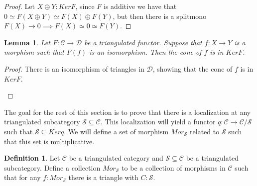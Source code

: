 \documentclass[12pt]{article}
\newtheorem{lemma}[theorem]{Lemma}
\theoremstyle{definition}
\newtheorem{definition}{Definition}[section]
\theoremstyle{remark}
\begin{document}
            \begin{proof}
                Let $X\oplus Y:KerF$, since $F$ is additive we have that $0\simeq F(X\oplus Y)\simeq F(X)\oplus F(Y)$, but then there is a splitmono $F(X)\rightarrow 0 \implies F(X)\simeq 0 \simeq F(Y)$.
            \end{proof}

            \begin{lemma}
                Let $F:\mathcal{C}\rightarrow\mathcal{D}$ be a triangulated functor. Suppose that $f:X\rightarrow Y$ is a morphism such that $F(f)$ is an isomorphism. Then the cone of $f$ is in $KerF$.
            \end{lemma}

            \begin{proof}
                There is an isomorphism of triangles in $\mathcal{D}$, showing that the cone of $f$ is in $KerF$.
                \begin{center}
                \end{center}
            \end{proof}

            The goal for the rest of this section is to prove that there is a localization at any triangulated subcategory $\mathcal{S}\subseteq\mathcal{C}$. This localization will yield a functor $q:\mathcal{C}\rightarrow \mathcal{C}/\mathcal{S}$ such that $\mathcal{S}\subseteq Kerq$. We will define a set of morphism $Mor_\mathcal{S}$ related to $\mathcal{S}$ such that this set is multiplicative.

            \begin{definition}
                Let $\mathcal{C}$ be a triangulated category and $\mathcal{S} \subseteq \mathcal{C}$ be a triangulated subcategory. Define a collection $Mor_{\mathcal{S}}$ to be a collection of morphisms in $\mathcal{C}$ such that for any $f : Mor_{\mathcal{S}}$ there is a triangle with $C : \mathcal{S}$.
                \begin{center}
                \end{center}
            \end{definition}
\end{document}
